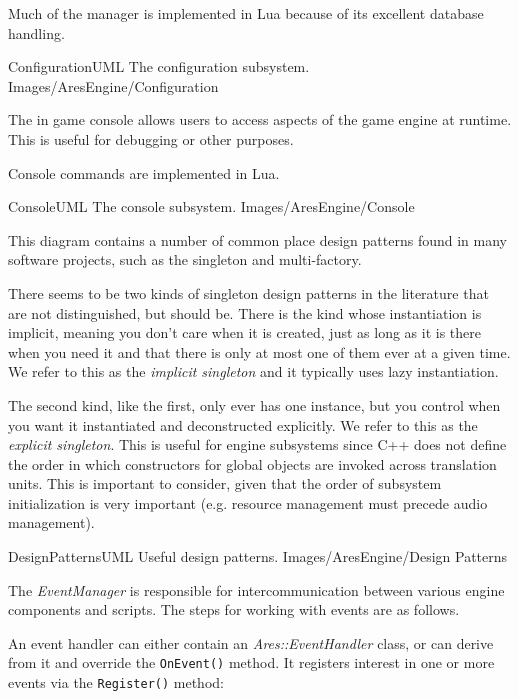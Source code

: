 Much of the manager is implemented in Lua because of its excellent database handling.

\FullPageLandscapeDiagram
    {ConfigurationUML}
    {The configuration subsystem.}
    {Images/AresEngine/Configuration}

\page
{}
The in game console allows users to access aspects of the game engine at runtime. This is useful for debugging or other purposes.

Console commands are implemented in Lua.

\FullPageLandscapeDiagram
    {ConsoleUML}
    {The console subsystem.}
    {Images/AresEngine/Console}

\page
{}
This diagram contains a number of common place design patterns found in many software projects, such as the singleton and multi-factory. 

There seems to be two kinds of singleton design patterns in the literature that are not distinguished, but should be. There is the kind whose instantiation is implicit, meaning you don't care when it is created, just as long as it is there when you need it and that there is only at most one of them ever at a given time. We refer to this as the {\it implicit singleton} and it typically uses lazy instantiation.

The second kind, like the first, only ever has one instance, but you control when you want it instantiated and deconstructed explicitly. We refer to this as the {\it explicit singleton}. This is useful for engine subsystems since C++ does not define the order in which constructors for global objects are invoked across translation units. This is important to consider, given that the order of subsystem initialization is very important (e.g. resource management must precede audio management).

\FullPageLandscapeDiagram
    {DesignPatternsUML}
    {Useful design patterns.}
    {Images/AresEngine/Design Patterns}

\page 
{}
The {\it EventManager} is responsible for intercommunication between various engine components and scripts. The steps for working with events are as follows.

An event handler can either contain an {\it Ares::EventHandler} class, or can derive from it and override the {\tt OnEvent()} method. It registers interest in one or more events via the {\tt Register()} method:

